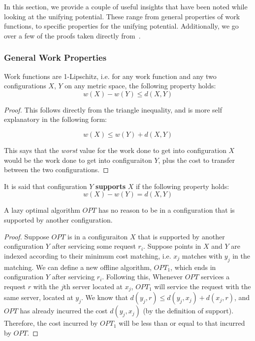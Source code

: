 In this section, we provide a couple of useful insights that have been noted while looking at the unifying potential. These range from general properties of work functions, to specific properties for the unifying potential. Additionally, we go over a few of the proofs taken directly from~\cite{unifyingPotential2021}. 

\subsubsection*{General Work Properties}

\begin{lemma}
    \label{lem:lip}
    Work functions are 1-Lipschitz, i.e. for any work function and any two configurations $X$, $Y$ on any metric space, the following property holds: 
    \begin{equation*}
        w(X) - w(Y) \leq d(X, Y)
    \end{equation*} 
\end{lemma}

\begin{proof}
    This follows directly from the triangle inequality, and is more self explanatory in the following form: 
    
    \begin{equation*}
        w(X) \leq w(Y) + d(X, Y)
    \end{equation*}

    This says that the \textit{worst} value for the work done to get into configuration $X$ would be the work done to get into configuraiton $Y$, plus the cost to transfer between the two configurations.
\end{proof}

\begin{definition}
    It is said that configuration $Y$ \textbf{supports} $X$ if the following property holds:
    \begin{equation*}
        w(X) - w(Y) = d(X,Y)
    \end{equation*}
\end{definition}

\begin{lemma}
    A lazy optimal algorithm $OPT$ has no reason to be in a configuration that is supported by another configuration.
\end{lemma}

\begin{proof}
    Suppose $OPT$ is in a configuraiton $X$ that is supported by another configuration $Y$ after servicing some request $r_i$. Suppose points in $X$ and $Y$ are indexed according to their minimum cost matching, i.e. $x_j$ matches with $y_j$ in the matching. We can define a new offline algorithm, $OPT_1$, which ends in configuration $Y$ after servicing $r_i$. Following this, Whenever $OPT$ services a request $r$ with the $j$th server located at $x_j$, $OPT_1$ will service the request with the same server, located at $y_j$. We know that $d(y_j, r) \leq d(y_j, x_j) + d(x_j, r)$, and $OPT$ has already incurred the cost $d(y_j, x_j)$ (by the definition of support). Therefore, the cost incurred by $OPT_1$ will be less than or equal to that incurred by $OPT$.
\end{proof}


